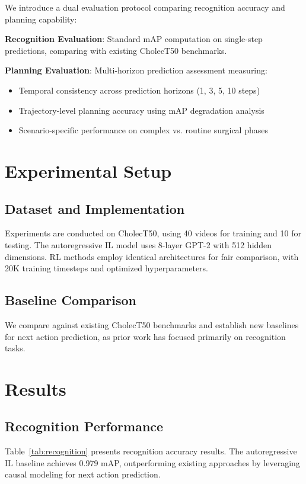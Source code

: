 \documentclass[runningheads]{llncs}
\begin{document}
We introduce a dual evaluation protocol comparing recognition accuracy and planning capability:

\textbf{Recognition Evaluation}: Standard mAP computation on single-step predictions, comparing with existing CholecT50 benchmarks.

\textbf{Planning Evaluation}: Multi-horizon prediction assessment measuring:
\begin{itemize}
\item Temporal consistency across prediction horizons (1, 3, 5, 10 steps)
\item Trajectory-level planning accuracy using mAP degradation analysis
\item Scenario-specific performance on complex vs. routine surgical phases
\end{itemize}

\section{Experimental Setup}

\subsection{Dataset and Implementation}
Experiments are conducted on CholecT50, using 40 videos for training and 10 for testing. The autoregressive IL model uses 8-layer GPT-2 with 512 hidden dimensions. RL methods employ identical architectures for fair comparison, with 20K training timesteps and optimized hyperparameters.

\subsection{Baseline Comparison}
We compare against existing CholecT50 benchmarks and establish new baselines for next action prediction, as prior work has focused primarily on recognition tasks.

\section{Results}

\subsection{Recognition Performance}

Table~\ref{tab:recognition} presents recognition accuracy results. The autoregressive IL baseline achieves 0.979 mAP, outperforming existing approaches by leveraging causal modeling for next action prediction.
\end{document}
